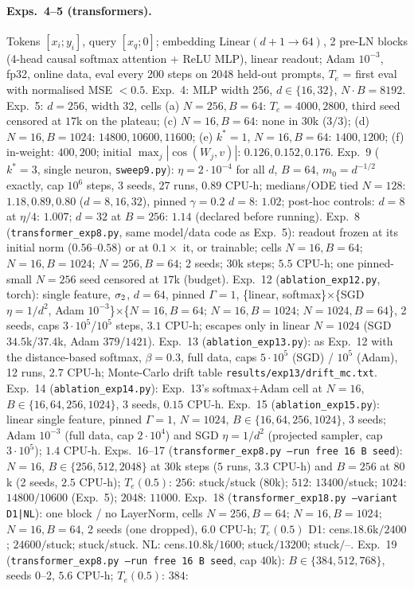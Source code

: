 \paragraph{Exps.~4--5 (transformers).} Tokens $[x_i;y_i]$, query $[x_q;0]$; embedding $\mathrm{Linear}(d{+}1\to64)$, 2 pre-LN blocks
(4-head causal softmax attention + ReLU MLP), linear readout; Adam $10^{-3}$, fp32, online data, eval every 200 steps on 2048 held-out
prompts, $T_e$ = first eval with normalised MSE $<0.5$. Exp.~4: MLP width 256, $d\in\{16,32\}$, $N\cdot B=8192$. Exp.~5: $d=256$, width 32,
cells (a) $N{=}256,B{=}64$: $T_e=4000,2800$, third seed censored at $17$k on the plateau; (c) $N{=}16,B{=}64$: none in $30$k ($3/3$); (d)
$N{=}16,B{=}1024$: $14800,10600,11600$; (e) $k^*=1$, $N{=}16,B{=}64$: $1400,1200$; (f) in-weight: $400,200$; initial $\max_j|\cos(W_j,v)|$:
$0.126,0.152,0.176$. Exp.~9 ($k^*=3$, single neuron, \texttt{sweep9.py}): $\eta=2\cdot10^{-4}$ for all $d$, $B=64$, $m_0=d^{-1/2}$ exactly, cap $10^6$ steps, 3 seeds, 27 runs, $0.89$ CPU-h; medians/ODE tied $N{=}128$: $1.18,0.89,0.80$ ($d=8,16,32$), pinned $\gamma{=}0.2$ $d{=}8$: $1.02$; post-hoc controls: $d{=}8$ at $\eta/4$: $1.007$; $d{=}32$ at $B{=}256$: $1.14$ (declared before running). Exp.~8 (\texttt{transformer\_exp8.py}, same model/data code as Exp.~5): readout frozen at its initial norm ($0.56$--$0.58$) or at $0.1\times$ it, or trainable; cells $N{=}16,B{=}64$; $N{=}16,B{=}1024$; $N{=}256,B{=}64$; 2 seeds; $30$k steps; $5.5$ CPU-h; one pinned-small $N{=}256$ seed censored at $17$k (budget). Exp.~12 (\texttt{ablation\_exp12.py}, torch): single feature, $\sigma_2$, $d{=}64$, pinned $\Gamma{=}1$, \{linear, softmax\}$\times$\{SGD $\eta{=}1/d^2$, Adam $10^{-3}$\}$\times$\{$N{=}16,B{=}64$; $N{=}16,B{=}1024$; $N{=}1024,B{=}64$\}, 2 seeds, caps $3\cdot10^5$/$10^5$ steps, $3.1$ CPU-h; escapes only in linear $N{=}1024$ (SGD $34.5$k/$37.4$k, Adam $379$/$1421$). Exp.~13 (\texttt{ablation\_exp13.py}): as Exp.~12 with the distance-based softmax, $\beta{=}0.3$, full data, caps $5\cdot10^5$ (SGD) / $10^5$ (Adam), 12 runs, $2.7$ CPU-h; Monte-Carlo drift table \texttt{results/exp13/drift\_mc.txt}. Exp.~14 (\texttt{ablation\_exp14.py}): Exp.~13's softmax+Adam cell at $N{=}16$, $B\in\{16,64,256,1024\}$, 3 seeds, $0.15$ CPU-h. Exp.~15 (\texttt{ablation\_exp15.py}): linear single feature, pinned $\Gamma{=}1$, $N{=}1024$, $B\in\{16,64,256,1024\}$, 3 seeds; Adam $10^{-3}$ (full data, cap $2\cdot10^4$) and SGD $\eta{=}1/d^2$ (projected sampler, cap $3\cdot10^5$); $1.4$ CPU-h. Exps.~16--17 (\texttt{transformer\_exp8.py --run free 16 B seed}): $N{=}16$, $B\in\{256,512,2048\}$ at $30$k steps ($5$ runs, $3.3$ CPU-h) and $B{=}256$ at $80$k (2 seeds, $2.5$ CPU-h); $T_e(0.5)$: $256$: stuck/stuck ($80$k); $512$: $13400$/stuck; $1024$: $14800/10600$ (Exp.~5); $2048$: $11000$. Exp.~18 (\texttt{transformer\_exp18.py --variant D1|NL}): one block / no LayerNorm, cells $N{=}256,B{=}64$; $N{=}16,B{=}1024$; $N{=}16,B{=}64$, 2 seeds (one dropped), $6.0$ CPU-h; $T_e(0.5)$ D1: cens.$18.6$k$/2400$; $24600/$stuck; stuck/stuck. NL: cens.$10.8$k$/1600$; stuck$/13200$; stuck$/$--. Exp.~19 (\texttt{transformer\_exp8.py --run free 16 B seed}, cap $40$k): $B\in\{384,512,768\}$, seeds 0--2, $5.6$ CPU-h; $T_e(0.5)$: $384$: 